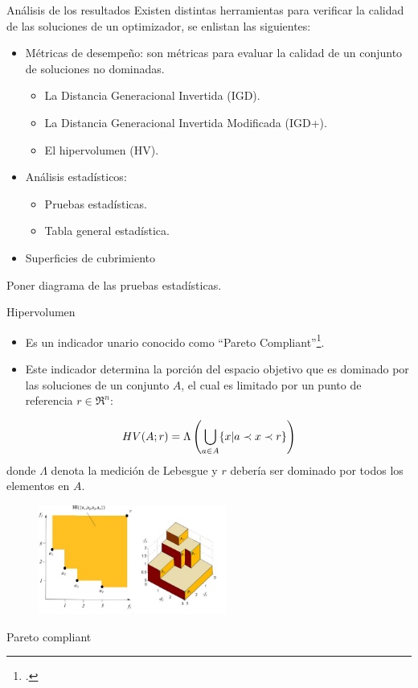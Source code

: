 \documentclass{beamer}
\begin{document}
\begin{frame}{Análisis de los resultados}
Existen distintas herramientas para verificar la calidad de las soluciones de un optimizador, se enlistan las siguientes:
\begin{itemize}
\justifying
\item Métricas de desempeño: son métricas para evaluar la calidad de un conjunto de soluciones no dominadas.
   \begin{itemize}
     \item La Distancia Generacional Invertida (IGD).
     \item La Distancia Generacional Invertida Modificada (IGD+).
     \item El hipervolumen (HV).
   \end{itemize}
\item Análisis estadísticos:
  \begin{itemize}
      \item Pruebas estadísticas.
      \item Tabla general estadística.
  \end{itemize}
  \item Superficies de cubrimiento
\end{itemize}
Poner diagrama de las pruebas estadísticas.
\end{frame}



\begin{frame}{Hipervolumen}
\begin{itemize}
\justifying
\item Es un indicador unario conocido como ``Pareto Compliant''\footcite{zitzler1999evolutionary}.
\item Este indicador determina la porción del espacio objetivo que es dominado por las soluciones de un conjunto $A$, el cual es limitado por un punto de referencia $r \in \Re^n$:
\end{itemize}
\begin{equation}
\scriptsize
    HV(A;r) = \Lambda \left (  \bigcup_{a \in A} \{ x | a \prec x \prec r \} \right )
\end{equation}
donde $\Lambda$ denota la medición de Lebesgue y $r$ debería ser dominado por todos los elementos en $A$.
\begin{figure}[H]
\centering
\includegraphics[width=0.55\textwidth]{HV.jpg}
\end{figure}
\end{frame}
\begin{frame}{Pareto compliant}
    
\end{frame}
\end{document}
